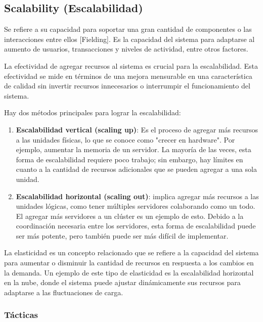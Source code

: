 \documentclass{article}
\begin{document}
 		
	
		\subsection{Scalability \small{(Escalabilidad)} }
		Se refiere a su capacidad para soportar una gran cantidad de componentes o las interacciones entre ellos [Fielding]. Es la capacidad del sistema para adaptarse al aumento de usuarios, transacciones y niveles de actividad, entre otros factores.
		
		La efectividad de agregar recursos al sistema es crucial para la escalabilidad. Esta efectividad se mide en términos de una mejora mensurable en una característica de calidad sin invertir recursos innecesarios o interrumpir el funcionamiento del sistema.
		
		Hay dos métodos principales para lograr la escalabilidad:
		
		\begin{enumerate}	
			\item \textbf{Escalabilidad vertical (scaling up)}: Es el proceso de agregar más recursos a las unidades físicas, lo que se conoce como "crecer en hardware". Por ejemplo, aumentar la memoria de un servidor. La mayoría de las veces, esta forma de escalabilidad requiere poco trabajo; sin embargo, hay límites en cuanto a la cantidad de recursos adicionales que se pueden agregar a una sola unidad.
			
			
			\item \textbf{Escalabilidad horizontal (scaling out)}: implica agregar más recursos a las unidades lógicas, como tener múltiples servidores colaborando como un todo. El agregar más servidores a un clúster es un ejemplo de esto. Debido a la coordinación necesaria entre los servidores, esta forma de escalabilidad puede ser más potente, pero también puede ser más difícil de implementar.
					
		\end{enumerate}
		La elasticidad es un concepto relacionado que se refiere a la capacidad del sistema para aumentar o disminuir la cantidad de recursos en respuesta a los cambios en la demanda. Un ejemplo de este tipo de elasticidad es la escalabilidad horizontal en la nube, donde el sistema puede ajustar dinámicamente sus recursos para adaptarse a las fluctuaciones de carga.
		
	\subsubsection{Tácticas}
		
\end{document}
